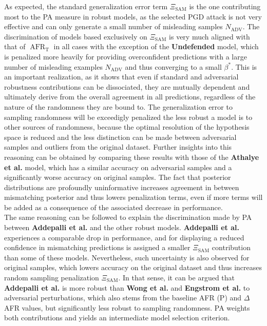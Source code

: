 As expected, the standard generalization error term $\Xi_{\text{SAM}}$ is the one contributing most to
the PA measure in robust models, as the selected PGD attack is not very effective and can only generate
a small number of misleading samples $N_{\text{ADV}}$. The discrimination of models based exclusively 
on $\Xi_{\text{SAM}}$  is very much aligned with that of $\operatorname{AFR}_\text{T}$ in all cases with the exception of the
{\color{tab:orange} \textbf{Undefended}} model, which is penalized more heavily for providing
overconfident predictions with a large number of misleading examples $N_{\text{ADV}}$ and
thus converging to a small $\beta^{*}$. This is an important realization, as it shows that even if
standard and adversarial robustness contributions can be dissociated, they are mutually dependent
and ultimately derive from the overall agreement in all predictions, regardless of the nature of the
randomness they are bound to. The generalization error to sampling randomness will be exceedigly penalized
the less robust a model is to other sources of randomness, because the optimal resolution of the hypothesis
space is reduced and the less distinction can be made between adversarial samples and outliers from
the original dataset. Further insights into this reasoning can be obtained by comparing these results
with those of the {\color{tab:green} \textbf{Athalye et al.}} model, which has a similar accuracy
on adversarial samples and a significantly worse accuracy on original samples. The fact that posterior
distributions are profoundly uninformative increases agreement in between mismatching posterior and
thus lowers penalization terms, even if more terms will be added as a consequence of the
associated decrease in performance. \\

The same reasoning can be followed to explain the discrimination made by PA between
{\color{tab:purple} \textbf{Addepalli et al.}} and the other robust models. {\color{tab:purple} \textbf{Addepalli et al.}}
experiences a comparable drop in performance, and for displaying a reduced confidence in mismatching predictions
is assigned a smaller $\Xi_{\text{SAM}}$ contribution than some of these models. Nevertheless, such 
uncertainty is also observed for original samples, which lowers accuracy on the original dataset 
and thus increases random sampling penalization $\Xi_{\text{SAM}}$. In that sense, it can be argued
that {\color{tab:purple} \textbf{Addepalli et al.}} is more robust than {\color{tab:red} \textbf{Wong et al.}}
and {\color{tab:blue} \textbf{Engstrom et al.}} to adversarial perturbations, which also stems from
the baseline AFR (P) and $\Delta$AFR values, but significantly less robust to sampling randomness.
PA weights both contributions and yields an intermediate model selection criterion. \\

